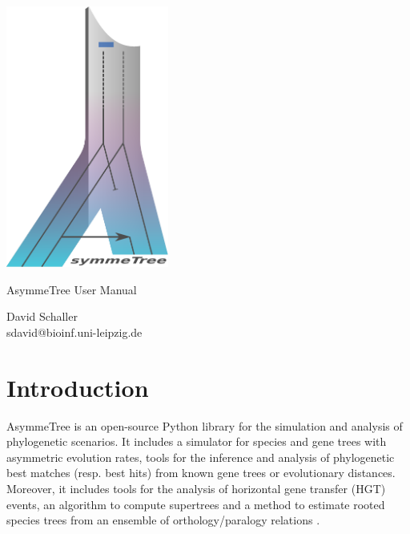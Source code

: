 \documentclass[hidelinks,11pt]{article}
\begin{document}
\begin{titlepage}
	\begin{center}
		\includegraphics[width=0.4\textwidth]{logo.pdf}
	\end{center}
	\begin{center}
		\vspace*{2cm}

		\Huge{
			AsymmeTree User Manual
		}

		\vspace{1.5cm}

		\LARGE
		David Schaller\\
		\vspace{1cm}
		\large
		sdavid@bioinf.uni-leipzig.de

		\vspace{2cm}

	\end{center}
\end{titlepage}

\newpage

\tableofcontents
\newpage

\section{Introduction}

AsymmeTree is an open-source Python library for the simulation and analysis of phylogenetic scenarios.
It includes a simulator for species and gene trees with asymmetric evolution 
rates, tools for the inference and analysis of phylogenetic best matches 
\citep{geiss2019a,geiss2020c} (resp. best hits) from known gene trees or 
evolutionary distances. Moreover, it includes tools for the analysis of 
horizontal gene transfer (HGT) events, an algorithm to compute supertrees 
\citep{deng2016} and a method to estimate rooted species trees from an ensemble 
of orthology/paralogy relations \citep{hellmuth2015}.
\end{document}

